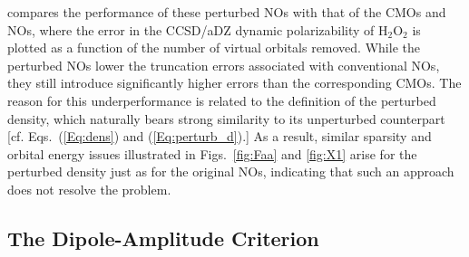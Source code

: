 compares the performance of these perturbed NOs with
that of the CMOs and NOs, where the error in the CCSD/aDZ dynamic
polarizability of H$_2$O$_2$ is plotted as a function of the number of virtual
orbitals removed. While the perturbed NOs lower the truncation errors
associated with conventional NOs, they still introduce significantly higher
errors than the corresponding CMOs.  The reason for this underperformance is
related to the definition of the perturbed density, which naturally bears
strong similarity to its unperturbed counterpart [cf. Eqs.~(\ref{Eq:dens}) and
(\ref{Eq:perturb_d}).]  As a result, similar sparsity and orbital energy issues
illustrated in Figs.~\ref{fig:Faa} and \ref{fig:X1} arise for the perturbed
density just as for the original NOs, indicating that such an approach does not
resolve the problem.

\subsection{The Dipole-Amplitude Criterion}

